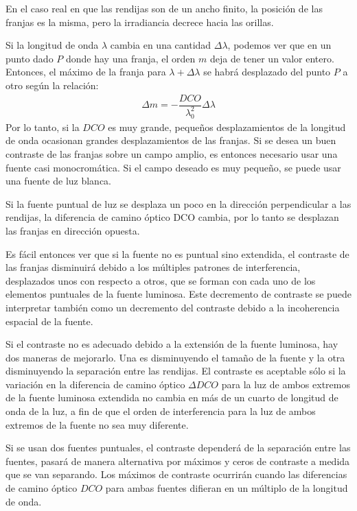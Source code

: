 \documentclass[14pt]{extarticle}
\begin{document}
En el caso real en que las rendijas son de un ancho finito, la posición de las franjas es la misma,  pero la irradiancia decrece hacia las orillas.

Si la longitud de onda $\lambda$ cambia en una cantidad $\Delta \lambda$, podemos ver que en un punto dado $P$ donde hay una franja, el orden $m$ deja de tener un valor entero. Entonces, el máximo de la franja para $\lambda + \Delta \lambda$ se habrá desplazado del punto $P$ a otro según la relación:
\begin{align}
\Delta m = - \dfrac{DCO}{\lambda_{0}^{2}} \Delta \lambda
\label{eq:ecuacion_IX_13}
\end{align}
Por lo tanto, si la $DCO$ es muy grande, pequeños desplazamientos de la longitud de onda ocasionan grandes desplazamientos de las franjas. Si se desea un buen contraste de las franjas sobre un campo amplio, es entonces necesario usar una fuente casi monocromática. Si el campo deseado es muy pequeño, se puede usar una fuente de luz blanca.

Si la fuente puntual de luz se desplaza un poco en la dirección perpendicular a las rendijas, la diferencia de camino óptico DCO cambia, por lo tanto se desplazan las franjas en dirección opuesta.

Es fácil entonces ver que si la fuente no es puntual sino extendida, el contraste de las franjas disminuirá debido a los múltiples patrones de interferencia, desplazados unos con respecto a otros, que se forman con cada uno de los elementos puntuales de la fuente luminosa. Este decremento de contraste se puede interpretar también como un decremento del contraste debido a la incoherencia espacial de la fuente.

Si el contraste no es adecuado debido a la extensión de la fuente luminosa, hay dos maneras de mejorarlo. Una es disminuyendo el tamaño de la fuente y la otra disminuyendo la separación entre las rendijas. El contraste es aceptable sólo si la variación en la diferencia de camino óptico $\Delta DCO$ para la luz de ambos extremos de la fuente luminosa extendida no cambia en más de un cuarto de longitud de onda de la luz, a fin de que el orden de interferencia para la luz de ambos extremos de la fuente no sea muy diferente.

Si se usan dos fuentes puntuales, el contraste dependerá de la separación entre las fuentes, pasará de manera alternativa por máximos y ceros de contraste a medida que se van separando. Los máximos de contraste ocurrirán cuando las diferencias de camino óptico $DCO$ para ambas fuentes difieran en un múltiplo de la longitud de onda.
\end{document}
